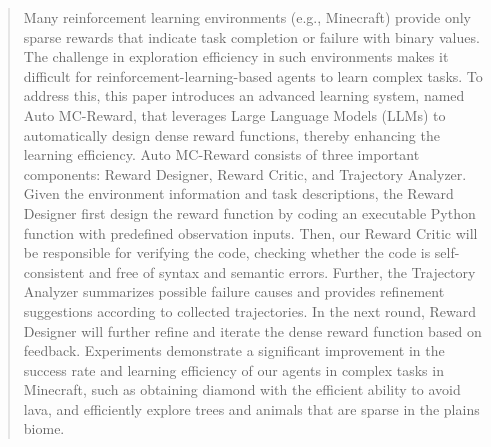 \begin{abstract}

Many reinforcement learning environments (e.g., Minecraft) provide only sparse rewards that indicate task completion or failure with binary values. The challenge in exploration efficiency in such environments makes it difficult for reinforcement-learning-based agents to learn complex tasks. To address this, this paper introduces an advanced learning system, named Auto MC-Reward, that leverages Large Language Models (LLMs) to automatically design dense reward functions, thereby enhancing the learning efficiency. Auto MC-Reward consists of three important components: Reward Designer, Reward Critic, and Trajectory Analyzer. Given the environment information and task descriptions, the Reward Designer first design the reward function by coding an executable Python function with predefined observation inputs. Then, our Reward Critic will be responsible for verifying the code, checking whether the code is self-consistent and free of syntax and semantic errors. Further, the Trajectory Analyzer summarizes possible failure causes and provides refinement suggestions according to collected trajectories. In the next round, Reward Designer will further refine and iterate the dense reward function based on feedback.
Experiments demonstrate a significant improvement in the success rate and learning efficiency of our agents in complex tasks in Minecraft, such as obtaining diamond with the efficient ability to avoid lava, and efficiently explore trees and animals that are sparse in the plains biome.

\end{abstract}

